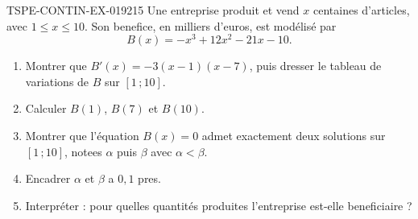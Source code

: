 \begin{exercice}{TSPE-CONTIN-EX-019}{2}{15}
Une entreprise produit et vend $x$ centaines d'articles, avec $1 \leq x \leq 10$. Son benefice, en milliers d'euros, est modélisé par
\[ B(x) = -x^3 + 12x^2 - 21x - 10. \]
\begin{enumerate}
  \item Montrer que $B'(x) = -3(x-1)(x-7)$, puis dresser le tableau de variations de $B$ sur $[1\,;10]$.
  \item Calculer $B(1)$, $B(7)$ et $B(10)$.
  \item Montrer que l'équation $B(x) = 0$ admet exactement deux solutions sur $[1\,;10]$, notees $\alpha$ puis $\beta$ avec $\alpha < \beta$.
  \item Encadrer $\alpha$ et $\beta$ a $0{,}1$ pres.
  \item Interpréter : pour quelles quantités produites l'entreprise est-elle beneficiaire ?
\end{enumerate}
\end{exercice}
